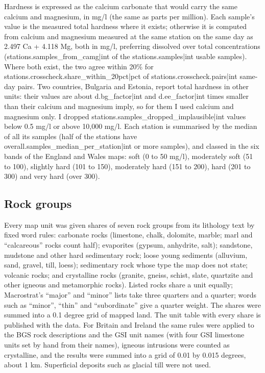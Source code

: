 \documentclass[11pt,a4paper]{article}
\begin{document}
Hardness is expressed as the calcium carbonate that would carry the same calcium and magnesium, in mg/l (the same as parts per million). Each sample's value is the measured total hardness where it exists; otherwise it is computed from calcium and magnesium measured at the same station on the same day as 2.497 Ca + 4.118 Mg, both in mg/l, preferring dissolved over total concentrations ({{stations.samples_from_camg|int}} of the {{stations.samples|int}} usable samples). Where both exist, the two agree within 20\% for {{stations.crosscheck.share_within_20pct|pct}} of {{stations.crosscheck.pairs|int}} same-day pairs. Two countries, Bulgaria and Estonia, report total hardness in other units: their values are about {{d.bg_factor|int}} and {{d.ee_factor|int}} times smaller than their calcium and magnesium imply, so for them I used calcium and magnesium only. I dropped {{stations.samples_dropped_implausible|int}} values below 0.5 mg/l or above 10,000 mg/l. Each station is summarised by the median of all its samples (half of the stations have {{overall.samples_median_per_station|int}} or more samples), and classed in the six bands of the England and Wales maps: soft (0 to 50 mg/l), moderately soft (51 to 100), slightly hard (101 to 150), moderately hard (151 to 200), hard (201 to 300) and very hard (over 300).

\subsection{Rock groups}

Every map unit was given shares of seven rock groups from its lithology text by fixed word rules: carbonate rocks (limestone, chalk, dolomite, marble; marl and ``calcareous'' rocks count half); evaporites (gypsum, anhydrite, salt); sandstone, mudstone and other hard sedimentary rock; loose young sediments (alluvium, sand, gravel, till, loess); sedimentary rock whose type the map does not state; volcanic rocks; and crystalline rocks (granite, gneiss, schist, slate, quartzite and other igneous and metamorphic rocks). Listed rocks share a unit equally; Macrostrat's ``major'' and ``minor'' lists take three quarters and a quarter; words such as ``minor'', ``thin'' and ``subordinate'' give a quarter weight. The shares were summed into a 0.1 degree grid of mapped land. The unit table with every share is published with the data. For Britain and Ireland the same rules were applied to the BGS rock descriptions and the GSI unit names (with four GSI limestone units set by hand from their names), igneous intrusions were counted as crystalline, and the results were summed into a grid of 0.01 by 0.015 degrees, about 1 km. Superficial deposits such as glacial till were not used.
\end{document}
